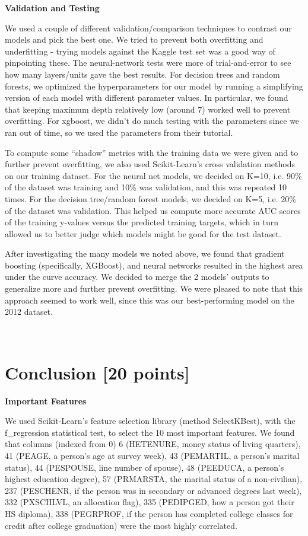 \vspace{1ex}
\noindent
\textbf{Validation and Testing}

\noindent
We used a couple of different validation/comparison techniques to contrast our models and pick the best one. We tried to prevent both overfitting and underfitting - trying models against the Kaggle test set was a good way of pinpointing these. The neural-network tests were more of trial-and-error to see how many layers/units gave the best results. For decision trees and random forests, we optimized the hyperparameters for our model by running a simplifying version of  each model with different parameter values. In particular, we found that keeping maximum depth relatively low (around 7) worked well to prevent overfitting. For xgboost, we didn’t do much testing with the parameters since we ran out of time, so we used the parameters from their tutorial.

\noindent
To compute some “shadow” metrics with the training data we were given and to further prevent overfitting, we also used Scikit-Learn’s cross validation methods on our training dataset. For the neural net models, we decided on K=10, i.e. 90\% of the dataset was training and 10\% was validation, and this was repeated 10 times. For the decision tree/random forest models, we decided on K=5, i.e. 20\% of the dataset was validation. This helped us compute more accurate AUC scores of the training y-values versus the predicted training targets, which in turn allowed us to better judge which models might be good for the test dataset.

\noindent
After investigating the many models we noted above, we found that gradient boosting (specifically, XGBoost), and neural networks resulted in the highest area under the curve accuracy. We decided to merge the 2 models’ outputs  to generalize more and further prevent overfitting. We were pleased to note that this approach seemed to work well, since this was our best-performing model on the 2012 dataset.

\newpage~
\newpage

\section{Conclusion [20 points]}

\vspace{2ex}

\noindent
\textbf{Important Features}

\noindent
We used Scikit-Learn’s feature selection library (method SelectKBest), with the f_regression statistical test, to select the 10 most important features. We found that columns (indexed from 0) 6 (HETENURE, money status of living quarters), 41 (PEAGE, a person’s age at survey week), 43 (PEMARTIL, a person’s marital status), 44 (PESPOUSE, line number of spouse), 48 (PEEDUCA, a person’s highest education degree), 57 (PRMARSTA, the marital status of a non-civilian), 237 (PESCHENR, if the person was in secondary or advanced degrees last week), 332 (PXSCHLVL, an allocation flag), 335 (PEDIPGED, how a person got their HS diploma), 338 (PEGRPROF, if the person has completed college classes for credit after college graduation) were the most highly correlated.

